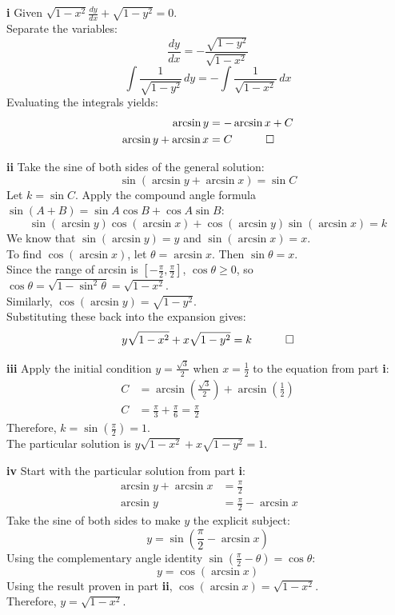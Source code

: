 \begin{solution}
\textbf{i} Given $\sqrt{1-x^2} \frac{dy}{dx} + \sqrt{1-y^2} = 0$. \\
Separate the variables:
\[ \frac{dy}{dx} = -\frac{\sqrt{1-y^2}}{\sqrt{1-x^2}} \]
\[ \int \frac{1}{\sqrt{1-y^2}} \, dy = -\int \frac{1}{\sqrt{1-x^2}} \, dx \]
Evaluating the integrals yields:
\begin{align*}
    \arcsin y &= -\arcsin x + C \\
    \arcsin y + \arcsin x &= C \quad \qed
\end{align*}

\vspace{0.3cm}
\textbf{ii} Take the sine of both sides of the general solution:
\[ \sin(\arcsin y + \arcsin x) = \sin C \]
Let $k = \sin C$. Apply the compound angle formula $\sin(A+B) = \sin A \cos B + \cos A \sin B$:
\[ \sin(\arcsin y)\cos(\arcsin x) + \cos(\arcsin y)\sin(\arcsin x) = k \]
We know that $\sin(\arcsin y) = y$ and $\sin(\arcsin x) = x$. \\
To find $\cos(\arcsin x)$, let $\theta = \arcsin x$. Then $\sin\theta = x$. \\
Since the range of arcsin is $[-\frac{\pi}{2}, \frac{\pi}{2}]$, $\cos\theta \ge 0$, so $\cos\theta = \sqrt{1 - \sin^2\theta} = \sqrt{1-x^2}$. \\
Similarly, $\cos(\arcsin y) = \sqrt{1-y^2}$. \\
Substituting these back into the expansion gives:
\[ y\sqrt{1-x^2} + x\sqrt{1-y^2} = k \quad \qed \]

\vspace{0.3cm}
\textbf{iii} Apply the initial condition $y = \frac{\sqrt{3}}{2}$ when $x = \frac{1}{2}$ to the equation from part \textbf{i}:
\begin{align*}
    C &= \arcsin\left(\frac{\sqrt{3}}{2}\right) + \arcsin\left(\frac{1}{2}\right) \\
    C &= \frac{\pi}{3} + \frac{\pi}{6} = \frac{\pi}{2}
\end{align*}
Therefore, $k = \sin\left(\frac{\pi}{2}\right) = 1$. \\
The particular solution is $y\sqrt{1-x^2} + x\sqrt{1-y^2} = 1$.

\vspace{0.3cm}
\textbf{iv} Start with the particular solution from part \textbf{i}:
\begin{align*}
    \arcsin y + \arcsin x &= \frac{\pi}{2} \\
    \arcsin y &= \frac{\pi}{2} - \arcsin x
\end{align*}
Take the sine of both sides to make $y$ the explicit subject:
\[ y = \sin\left(\frac{\pi}{2} - \arcsin x\right) \]
Using the complementary angle identity $\sin(\frac{\pi}{2} - \theta) = \cos\theta$:
\[ y = \cos(\arcsin x) \]
Using the result proven in part \textbf{ii}, $\cos(\arcsin x) = \sqrt{1-x^2}$. \\
Therefore, \textbf{$y = \sqrt{1-x^2}$}.


\end{solution}
